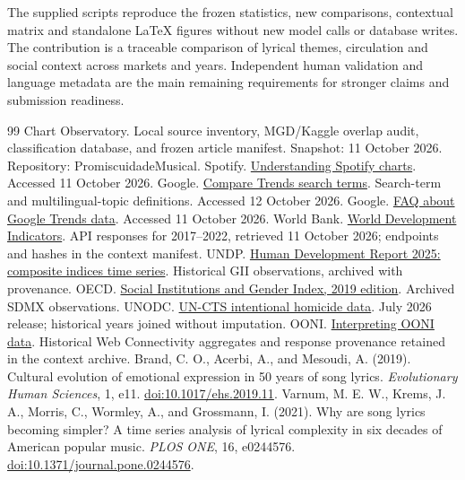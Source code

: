 \documentclass[10pt,a4paper,twocolumn]{article}
\begin{document}
The supplied scripts reproduce the frozen statistics, new comparisons, contextual matrix and standalone LaTeX figures without new model calls or database writes. The contribution is a traceable comparison of lyrical themes, circulation and social context across markets and years. Independent human validation and language metadata are the main remaining requirements for stronger claims and submission readiness.

\begingroup\scriptsize
\begin{thebibliography}{99}
\setlength{\itemsep}{1pt}\setlength{\parskip}{0pt}
 Chart Observatory. Local source inventory, MGD/Kaggle overlap audit, classification database, and frozen article manifest. Snapshot: 11 October 2026. Repository: PromiscuidadeMusical.
 Spotify. \href{https://support.spotify.com/us/artists/article/understanding-spotify-charts/}{Understanding Spotify charts}. Accessed 11 October 2026.
 Google. \href{https://support.google.com/trends/answer/4359550?hl=en}{Compare Trends search terms}. Search-term and multilingual-topic definitions. Accessed 12 October 2026.
 Google. \href{https://support.google.com/trends/answer/4365533?hl=en}{FAQ about Google Trends data}. Accessed 11 October 2026.
 World Bank. \href{https://data.worldbank.org/}{World Development Indicators}. API responses for 2017--2022, retrieved 11 October 2026; endpoints and hashes in the context manifest.
 UNDP. \href{https://hdr.undp.org/data-center/documentation-and-downloads}{Human Development Report 2025: composite indices time series}. Historical GII observations, archived with provenance.
 OECD. \href{https://www.oecd.org/en/topics/sub-issues/social-institutions-and-gender-index.html}{Social Institutions and Gender Index, 2019 edition}. Archived SDMX observations.
 UNODC. \href{https://dataunodc.un.org/dp-intentional-homicide-victims}{UN-CTS intentional homicide data}. July 2026 release; historical years joined without imputation.
 OONI. \href{https://ooni.org/support/interpreting-ooni-data/}{Interpreting OONI data}. Historical Web Connectivity aggregates and response provenance retained in the context archive.
 Brand, C. O., Acerbi, A., and Mesoudi, A. (2019). Cultural evolution of emotional expression in 50 years of song lyrics. \textit{Evolutionary Human Sciences}, 1, e11. \href{https://doi.org/10.1017/ehs.2019.11}{doi:10.1017/ehs.2019.11}.
 Varnum, M. E. W., Krems, J. A., Morris, C., Wormley, A., and Grossmann, I. (2021). Why are song lyrics becoming simpler? A time series analysis of lyrical complexity in six decades of American popular music. \textit{PLOS ONE}, 16, e0244576. \href{https://doi.org/10.1371/journal.pone.0244576}{doi:10.1371/journal.pone.0244576}.

\end{thebibliography}
\end{document}
